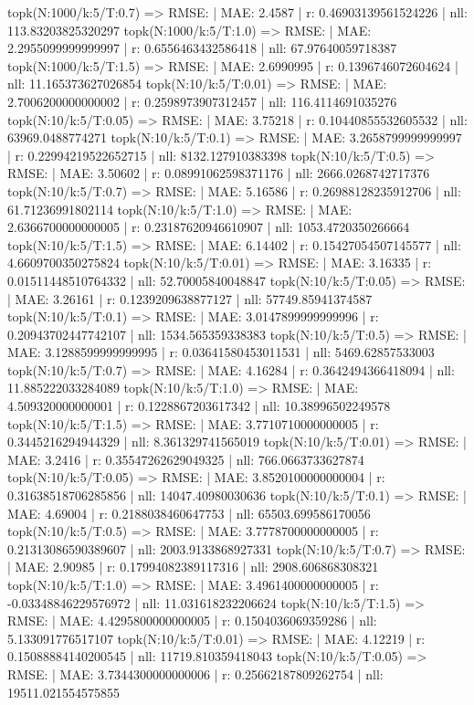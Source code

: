 topk(N:1000/k:5/T:0.7) => RMSE: | MAE: 2.4587 | r: 0.46903139561524226 | nll: 113.83203825320297
topk(N:1000/k:5/T:1.0) => RMSE: | MAE: 2.2955099999999997 | r: 0.6556463432586418 | nll: 67.97640059718387
topk(N:1000/k:5/T:1.5) => RMSE: | MAE: 2.6990995 | r: 0.1396746072604624 | nll: 11.165373627026854
topk(N:10/k:5/T:0.01) => RMSE: | MAE: 2.7006200000000002 | r: 0.2598973907312457 | nll: 116.4114691035276
topk(N:10/k:5/T:0.05) => RMSE: | MAE: 3.75218 | r: 0.10440855532605532 | nll: 63969.0488774271
topk(N:10/k:5/T:0.1) => RMSE: | MAE: 3.2658799999999997 | r: 0.22994219522652715 | nll: 8132.127910383398
topk(N:10/k:5/T:0.5) => RMSE: | MAE: 3.50602 | r: 0.08991062598371176 | nll: 2666.0268742717376
topk(N:10/k:5/T:0.7) => RMSE: | MAE: 5.16586 | r: 0.26988128235912706 | nll: 61.71236991802114
topk(N:10/k:5/T:1.0) => RMSE: | MAE: 2.6366700000000005 | r: 0.23187620946610907 | nll: 1053.4720350266664
topk(N:10/k:5/T:1.5) => RMSE: | MAE: 6.14402 | r: 0.15427054507145577 | nll: 4.6609700350275824
topk(N:10/k:5/T:0.01) => RMSE: | MAE: 3.16335 | r: 0.01511448510764332 | nll: 52.70005840048847
topk(N:10/k:5/T:0.05) => RMSE: | MAE: 3.26161 | r: 0.1239209638877127 | nll: 57749.85941374587
topk(N:10/k:5/T:0.1) => RMSE: | MAE: 3.0147899999999996 | r: 0.20943702447742107 | nll: 1534.565359338383
topk(N:10/k:5/T:0.5) => RMSE: | MAE: 3.1288599999999995 | r: 0.03641580453011531 | nll: 5469.62857533003
topk(N:10/k:5/T:0.7) => RMSE: | MAE: 4.16284 | r: 0.3642494366418094 | nll: 11.885222033284089
topk(N:10/k:5/T:1.0) => RMSE: | MAE: 4.509320000000001 | r: 0.1228867203617342 | nll: 10.38996502249578
topk(N:10/k:5/T:1.5) => RMSE: | MAE: 3.7710710000000005 | r: 0.3445216294944329 | nll: 8.361329741565019
topk(N:10/k:5/T:0.01) => RMSE: | MAE: 3.2416 | r: 0.35547262629049325 | nll: 766.0663733627874
topk(N:10/k:5/T:0.05) => RMSE: | MAE: 3.8520100000000004 | r: 0.31638518706285856 | nll: 14047.40980030636
topk(N:10/k:5/T:0.1) => RMSE: | MAE: 4.69004 | r: 0.2188038460647753 | nll: 65503.699586170056
topk(N:10/k:5/T:0.5) => RMSE: | MAE: 3.7778700000000005 | r: 0.21313086590389607 | nll: 2003.9133868927331
topk(N:10/k:5/T:0.7) => RMSE: | MAE: 2.90985 | r: 0.17994082389117316 | nll: 2908.606868308321
topk(N:10/k:5/T:1.0) => RMSE: | MAE: 3.4961400000000005 | r: -0.03348846229576972 | nll: 11.031618232206624
topk(N:10/k:5/T:1.5) => RMSE: | MAE: 4.4295800000000005 | r: 0.1504036069359286 | nll: 5.133091776517107
topk(N:10/k:5/T:0.01) => RMSE: | MAE: 4.12219 | r: 0.15088884140200545 | nll: 11719.810359418043
topk(N:10/k:5/T:0.05) => RMSE: | MAE: 3.7344300000000006 | r: 0.25662187809262754 | nll: 19511.021554575855
